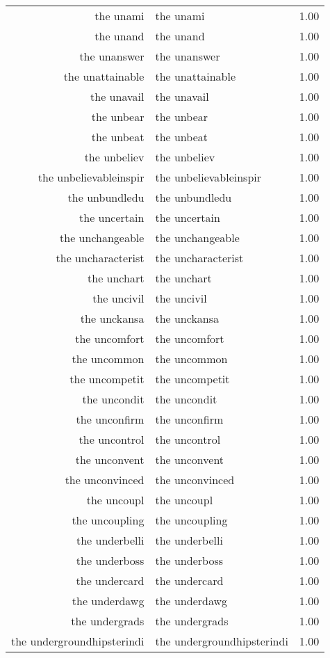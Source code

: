 \begin{table}[ht]
\begin{tabular}{rlr}
  the unami & the unami & 1.00 \\ 
  the unand & the unand & 1.00 \\ 
  the unanswer & the unanswer & 1.00 \\ 
  the unattainable & the unattainable & 1.00 \\ 
  the unavail & the unavail & 1.00 \\ 
  the unbear & the unbear & 1.00 \\ 
  the unbeat & the unbeat & 1.00 \\ 
  the unbeliev & the unbeliev & 1.00 \\ 
  the unbelievableinspir & the unbelievableinspir & 1.00 \\ 
  the unbundledu & the unbundledu & 1.00 \\ 
  the uncertain & the uncertain & 1.00 \\ 
  the unchangeable & the unchangeable & 1.00 \\ 
  the uncharacterist & the uncharacterist & 1.00 \\ 
  the unchart & the unchart & 1.00 \\ 
  the uncivil & the uncivil & 1.00 \\ 
  the unckansa & the unckansa & 1.00 \\ 
  the uncomfort & the uncomfort & 1.00 \\ 
  the uncommon & the uncommon & 1.00 \\ 
  the uncompetit & the uncompetit & 1.00 \\ 
  the uncondit & the uncondit & 1.00 \\ 
  the unconfirm & the unconfirm & 1.00 \\ 
  the uncontrol & the uncontrol & 1.00 \\ 
  the unconvent & the unconvent & 1.00 \\ 
  the unconvinced & the unconvinced & 1.00 \\ 
  the uncoupl & the uncoupl & 1.00 \\ 
  the uncoupling & the uncoupling & 1.00 \\ 
  the underbelli & the underbelli & 1.00 \\ 
  the underboss & the underboss & 1.00 \\ 
  the undercard & the undercard & 1.00 \\ 
  the underdawg & the underdawg & 1.00 \\ 
  the undergrads & the undergrads & 1.00 \\ 
  the undergroundhipsterindi & the undergroundhipsterindi & 1.00 \\ 

\end{tabular}
\end{table}
